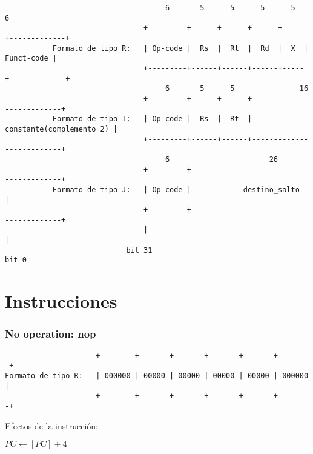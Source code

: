\documentclass[letterpaper,11pt]{scrartcl}
\begin{document}
\begin{table*}[!htbp]
\begin{small}
\begin{verbatim}
                                     6       5      5      5      5        6
                                +---------+------+------+------+-----+-------------+
           Formato de tipo R:   | Op-code |  Rs  |  Rt  |  Rd  |  X  |  Funct-code |
                                +---------+------+------+------+-----+-------------+
                                     6       5      5               16
                                +---------+------+------+--------------------------+
           Formato de tipo I:   | Op-code |  Rs  |  Rt  | constante(complemento 2) |
                                +---------+------+------+--------------------------+
                                     6                       26
                                +---------+----------------------------------------+
           Formato de tipo J:   | Op-code |            destino_salto               |
                                +---------+----------------------------------------+
                                |                                                  |
                            bit 31                                             bit 0

\end{verbatim} 
\end{small}
\end{table*}

\section*{Instrucciones}

\subsubsection*{No operation: \textbf{nop}}

\begin{verbatim}
                     +--------+-------+-------+-------+-------+--------+ 
Formato de tipo R:   | 000000 | 00000 | 00000 | 00000 | 00000 | 000000 | 
                     +--------+-------+-------+-------+-------+--------+ 
\end{verbatim}

Efectos de la instrucción: 

$ PC \leftarrow [PC] + 4 $
\end{document}
